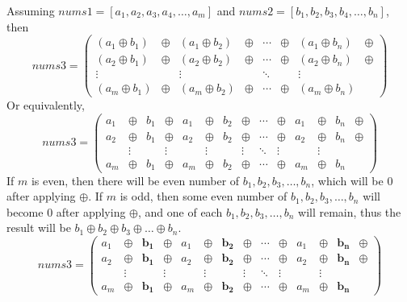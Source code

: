 \documentclass{article}
\begin{document}
	Assuming \(nums1 = [a_1, a_2, a_3, a_4, \dots, a_m]\) and \(nums2 = [b_1, b_2, b_3, b_4, \dots, b_n]\), then 
	\[
		nums3 =
		\left (
		 {\begin{array}{cccccccc}
		 		
				(a_1 \oplus b_1) & \oplus & (a_1 \oplus b_2) & \oplus & \cdots & \oplus & (a_1 \oplus b_n) & \oplus \\
				(a_2 \oplus b_1) & \oplus & (a_2 \oplus b_2) & \oplus & \cdots & \oplus & (a_2 \oplus b_n) & \oplus \\
				\vdots&  & \vdots &  & \ddots &  & \vdots\\
				(a_m \oplus b_1) & \oplus & (a_m \oplus b_2) & \oplus & \cdots & \oplus & (a_m \oplus b_n) & 
		\end{array} } 
		\right )
	\]
	Or equivalently, 
	\[
	nums3 =
	\left (
	{\begin{array}{cccccccccccccccc}
			a_1 & \oplus & b_1 & \oplus & a_1 & \oplus & b_2 & \oplus & \cdots & \oplus & a_1 & \oplus & b_n & \oplus \\
			a_2 & \oplus & b_1 & \oplus & a_2 & \oplus & b_2 & \oplus & \cdots & \oplus & a_2 & \oplus & b_n & \oplus \\
			    & \vdots &     & \vdots &     & \vdots &     & \vdots & \ddots & \vdots &     & \vdots &     &        \\
			a_m & \oplus & b_1 & \oplus & a_m & \oplus & b_2 & \oplus & \cdots & \oplus & a_m & \oplus & b_n & 
	\end{array} } 
	\right )
	\]
	If \(m\) is even, then there will be even number of \(b_1, b_2, b_3, \dots, b_n\), which will be \(0\) after applying \(\oplus\).
	If \(m\) is odd, then some even number of \(b_1, b_2, b_3, \dots, b_n\) will become \(0\) after applying \(\oplus\), and one of each \(b_1, b_2, b_3, \dots, b_n\) will remain, thus the result will be \(b_1 \oplus b_2 \oplus b_3 \oplus \dots \oplus b_n\).
	\[
	nums3 =
	\left (
	{\begin{array}{cccccccccccccccc}
			
			a_1 & \oplus & \mathbf{b_1} & \oplus & a_1 & \oplus & \mathbf{b_2} & \oplus & \cdots & \oplus & a_1 & \oplus & \mathbf{b_n} & \oplus \\
			a_2 & \oplus & \mathbf{b_1} & \oplus & a_2 & \oplus & \mathbf{b_2} & \oplus & \cdots & \oplus & a_2 & \oplus & \mathbf{b_n} & \oplus \\
			    & \vdots &              & \vdots &     & \vdots &              & \vdots & \ddots & \vdots &     & \vdots &              &        \\
			a_m & \oplus & \mathbf{b_1} & \oplus & a_m & \oplus & \mathbf{b_2} & \oplus & \cdots & \oplus & a_m & \oplus & \mathbf{b_n} & 
	\end{array} } 
	\right )
	\]
\end{document}
